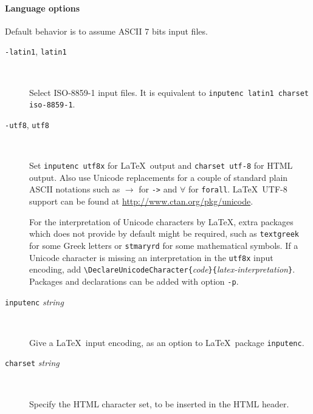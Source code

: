 \paragraph{Language options}

Default behavior is to assume ASCII 7 bits input files.

\begin{description}

\item[\texttt{-latin1}, \texttt{\mm{}latin1}] ~\par

  Select ISO-8859-1 input files. It is equivalent to
  \texttt{\mm{}inputenc latin1 \mm{}charset iso-8859-1}.

\item[\texttt{-utf8}, \texttt{\mm{}utf8}] ~\par

  Set \texttt{\mm{}inputenc utf8x} for \LaTeX\ output and
  \texttt{\mm{}charset utf-8} for HTML output. Also use Unicode
  replacements for a couple of standard plain ASCII notations such
  as $\rightarrow$ for \texttt{->} and $\forall$ for
  \texttt{forall}. \LaTeX\ UTF-8 support can be found at
  \url{http://www.ctan.org/pkg/unicode}.

  For the interpretation of Unicode characters by \LaTeX, extra
  packages which {\coqdoc} does not provide by default might be
  required, such as \texttt{textgreek} for some Greek letters or
  \texttt{stmaryrd} for some mathematical symbols. If a Unicode
  character is missing an interpretation in the \texttt{utf8x} input
  encoding, add
  \verb=\DeclareUnicodeCharacter{=\textit{code}\verb=}{=\textit{latex-interpretation}\verb=}=. Packages
  and declarations can be added with option \texttt{-p}.

\item[\texttt{\mm{}inputenc} \textit{string}] ~\par

  Give a \LaTeX\ input encoding, as an option to \LaTeX\ package
  \texttt{inputenc}. 

\item[\texttt{\mm{}charset} \textit{string}] ~\par

  Specify the HTML character set, to be inserted in the HTML header.

\end{description}



